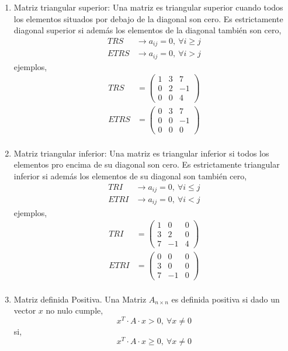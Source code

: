 \begin{enumerate}
\item Matriz triangular superior: Una matriz es triangular superior cuando todos los elementos situados por debajo de la diagonal son cero. Es estrictamente diagonal superior si además los elementos de la diagonal también son cero,
\begin{align*}
TRS& \rightarrow a_{ij} = 0, \ \forall i\geq j \\
ETRS& \rightarrow a_{ij} = 0, \ \forall i > j 
\end{align*}
ejemplos,
\begin{align*}
TRS&=\begin{pmatrix}
1 & 3 & 7\\
0 & 2 & -1\\
0 & 0 & 4
\end{pmatrix}\\
ETRS&=\begin{pmatrix}
0 & 3 & 7\\
0 & 0 & -1\\
0 & 0 & 0
\end{pmatrix}\\
\end{align*}
\item Matriz triangular inferior: Una matriz es triangular inferior si todos los elementos pro encima de su diagonal son cero. Es estrictamente triangular inferior si además los elementos de su diagonal son también cero,
\begin{align*}
TRI& \rightarrow a_{ij} = 0, \ \forall i\leq j \\
ETRI& \rightarrow a_{ij} = 0, \ \forall i < j 
\end{align*}
ejemplos,
\begin{align*}
TRI&=\begin{pmatrix}
1 & 0 & 0\\
3 & 2 & 0\\
7 & -1 & 4
\end{pmatrix}\\
ETRI&=\begin{pmatrix}
0 & 0 & 0\\
3 & 0 & 0\\
7 & -1 & 0
\end{pmatrix}\\
\end{align*}
\item Matriz definida Positiva. Una Matriz $A_{n \times n}$ es definida positiva si dado un vector $x$ no nulo cumple,
\begin{equation*}
x^T\cdot A \cdot x > 0, \ \forall x\neq 0
\end{equation*}
si,
\begin{equation*}
x^T\cdot A \cdot x \geq 0, \ \forall x\neq 0
\end{equation*}


\end{enumerate}
